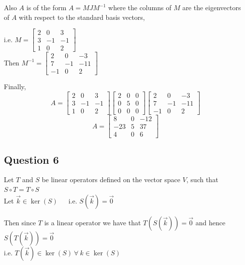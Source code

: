 \documentclass{article}
\begin{document}
Also \(A\) is of the form \(A = MJM^{-1}\) where the columns of \(M\) are the eigenvectors
of \(A\) with respect to the standard basis vectors, 

i.e. \(M = \begin{bmatrix}
    2 & 0 & 3 \\
    3 & -1 & -1 \\
    1 & 0 & 2
\end{bmatrix}\)
\\

Then \(M^{-1} = \begin{bmatrix}
    2 & 0 & -3 \\
    7 & -1 & -11 \\
    -1 & 0 & 2
\end{bmatrix}\)

Finally,
\[
A = \begin{bmatrix}
    2 & 0 & 3 \\
    3 & -1 & -1 \\
    1 & 0 & 2
\end{bmatrix} \begin{bmatrix}
    2 & 0 & 0 \\
    0 & 5 & 0 \\
    0 & 0 & 0 
\end{bmatrix}
\begin{bmatrix}
    2 & 0 & -3 \\
    7 & -1 & -11 \\
    -1 & 0 & 2
\end{bmatrix}
\]
\[
A = \begin{bmatrix}
    8 & 0 & -12 \\
    -23 & 5 & 37 \\
    4 & 0 & 6
\end{bmatrix}
\]


\subsection*{Question 6}
Let \(T\) and \(S\) be linear operators defined on the vector space \(V\),
such that \(S \circ T = T \circ S\)
\\

Let \(\vec{k} \in \ker(S)\ \quad \) i.e. \(S(\vec{k}) = \vec{0}\)

Then since \(T\) is a linear operator we have that \(T(S(\vec{k})) = \vec{0}\)
and hence \(S(T(\vec{k})) = \vec{0}\)
\\

i.e. \(T(\vec{k}) \in \ker(S)  \ \forall \ k \in \ker(S)\)
\end{document}
